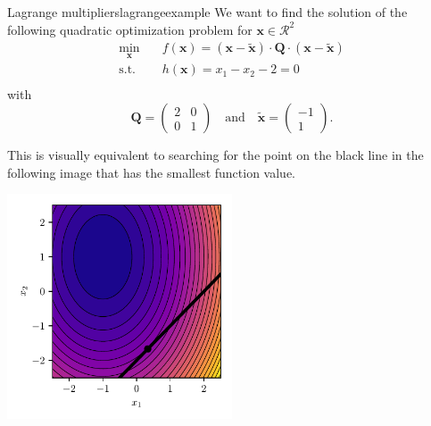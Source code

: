 \begin{example}{Lagrange multipliers}{lagrangeexample}
    We want to find the solution of the following quadratic optimization problem for $\mathbf{x} \in \mathcal{R}^2$
    \begin{equation}
        \begin{aligned}
            \min_{\mathbf{x}} \quad & f(\mathbf{x})= (\mathbf{x}-\tilde{\mathbf{x}}) \cdot \mathbf{Q} \cdot (\mathbf{x}-\tilde{\mathbf{x}})\\
            \textrm{s.t.} \quad     & h(\mathbf{x}) = x_1 - x_2 - 2 = 0  \\
        \end{aligned}
    \end{equation}
    with 
    \begin{equation}
        \mathbf{Q} = 
        \begin{pmatrix}
        2 & 0 \\
        0 & 1 
        \end{pmatrix} 
        \quad 
        \text{and}
        \quad
        \tilde{\mathbf{x}} = 
        \begin{pmatrix}
        -1\\
        1 
        \end{pmatrix}.
    \end{equation}

    This is visually equivalent to searching for the point on the black line in the following image that has the smallest function value.
    \begin{center}
        \includegraphics[width=0.5\textwidth]{figures/lagrange_example.pdf}
    \end{center}


\end{example}
